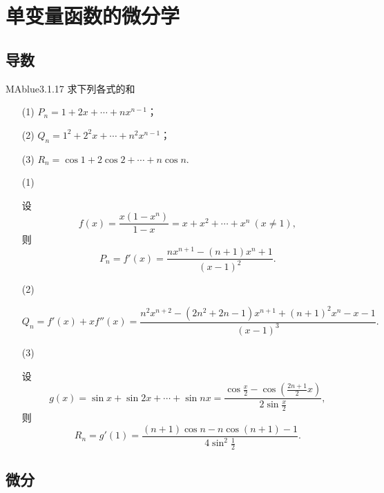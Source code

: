 \chapter{单变量函数的微分学}

\section{导数}

\begin{problem}{MAblue}{3.1.17}
    求下列各式的和
    \begin{enumerate}
        \item[(1)]
        $P_n = 1 + 2x + \cdots + nx^{n-1}$；
        \item[(2)]
        $Q_n = 1^2 + 2^2x + \cdots + n^2x^{n-1}$；
        \item[(3)]
        $R_n = \cos 1 + 2 \cos 2 + \cdots + n \cos n$.
    \end{enumerate}
\end{problem}

\begin{enumerate}
    \item[(1)]
    \begin{solution}
        设
        \[
            f(x) = \frac{x(1-x^n)}{1-x} = x + x^2 + \cdots + x^n \ (x \neq 1),
        \]
        则
        \[
            P_n = f'(x) = \frac{nx^{n+1}-(n+1)x^n+1}{(x-1)^2}.
        \]
    \end{solution}
    \item[(2)]
    \begin{solution}
        \[
            Q_n = f'(x)+xf''(x) = \frac{n^2x^{n+2}-(2n^2+2n-1)x^{n+1}+(n+1)^2x^n-x-1}{(x-1)^3}.
        \]
    \end{solution}
    \item[(3)]
    \begin{solution}
        设
        \[
            g(x) = \sin x + \sin 2x + \cdots + \sin nx = \frac{\cos\frac x 2 - \cos(\frac {2n+1} 2 x)}{2\sin\frac x 2},
        \]
        则
        \[
            R_n = g'(1) = \frac{(n+1)\cos n - n\cos(n+1)-1}{4\sin^2\frac 1 2}.
        \]
    \end{solution}
\end{enumerate}

\section{微分}

